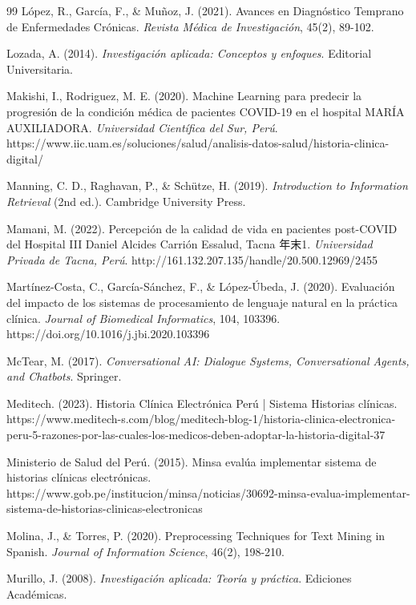 \documentclass[12pt,a4paper]{article}
\begin{document}
\begin{thebibliography}{99}
López, R., García, F., \& Muñoz, J. (2021). Avances en Diagnóstico Temprano de Enfermedades Crónicas. \textit{Revista Médica de Investigación}, 45(2), 89-102.

Lozada, A. (2014). \textit{Investigación aplicada: Conceptos y enfoques}. Editorial Universitaria.

Makishi, I., Rodriguez, M. E. (2020). Machine Learning para predecir la progresión de la condición médica de pacientes COVID-19 en el hospital MARÍA AUXILIADORA. \textit{Universidad Científica del Sur, Perú}. https://www.iic.uam.es/soluciones/salud/analisis-datos-salud/historia-clinica-digital/

Manning, C. D., Raghavan, P., \& Schütze, H. (2019). \textit{Introduction to Information Retrieval} (2nd ed.). Cambridge University Press.

Mamani, M. (2022). Percepción de la calidad de vida en pacientes post-COVID del Hospital III Daniel Alcides Carrión Essalud, Tacna 年末1. \textit{Universidad Privada de Tacna, Perú}. http://161.132.207.135/handle/20.500.12969/2455

Martínez-Costa, C., García-Sánchez, F., \& López-Úbeda, J. (2020). Evaluación del impacto de los sistemas de procesamiento de lenguaje natural en la práctica clínica. \textit{Journal of Biomedical Informatics}, 104, 103396. https://doi.org/10.1016/j.jbi.2020.103396

McTear, M. (2017). \textit{Conversational AI: Dialogue Systems, Conversational Agents, and Chatbots}. Springer.

Meditech. (2023). Historia Clínica Electrónica Perú | Sistema Historias clínicas. https://www.meditech-s.com/blog/meditech-blog-1/historia-clinica-electronica-peru-5-razones-por-las-cuales-los-medicos-deben-adoptar-la-historia-digital-37

Ministerio de Salud del Perú. (2015). Minsa evalúa implementar sistema de historias clínicas electrónicas. https://www.gob.pe/institucion/minsa/noticias/30692-minsa-evalua-implementar-sistema-de-historias-clinicas-electronicas

Molina, J., \& Torres, P. (2020). Preprocessing Techniques for Text Mining in Spanish. \textit{Journal of Information Science}, 46(2), 198-210.

Murillo, J. (2008). \textit{Investigación aplicada: Teoría y práctica}. Ediciones Académicas.


\end{thebibliography}
\end{document}
